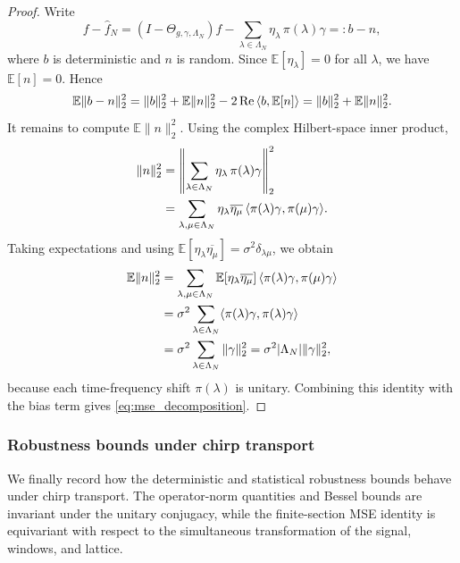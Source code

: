 \documentclass[final,1p,times,authoryear]{elsarticle}
\theoremstyle{definition}
\newcommand{\E}{\mathbb{E}}
\newcommand{\1}{\mathbf{1}}
\DeclareMathOperator{\Rea}{Re}
\DeclarePairedDelimiter{\inner}{\langle}{\rangle}
\begin{document}
{\begin{proof}
Write
$$
f-\widehat f_N
=
(I-\Theta_{g,\gamma,\Lambda_N})f
-
\sum_{\lambda\in\Lambda_N}\eta_\lambda\,\pi(\lambda)\gamma
=:b-n,
$$
where $b$ is deterministic and $n$ is random. Since $\E[\eta_\lambda]=0$ for all
$\lambda$, we have $\E[n]=0$. Hence
$$
\E\|b-n\|_2^2
=
\|b\|_2^2
+
\E\|n\|_2^2
-
2\Rea\,\inner{b,\E[n]}
=
\|b\|_2^2+\E\|n\|_2^2.
$$
It remains to compute $\E\|n\|_2^2$. Using the complex Hilbert-space inner product,
$$
\begin{aligned}
\|n\|_2^2
&=
\left\|
\sum_{\lambda\in\Lambda_N}\eta_\lambda\,\pi(\lambda)\gamma
\right\|_2^2 \\
&=
\sum_{\lambda,\mu\in\Lambda_N}
\eta_\lambda\overline{\eta_\mu}\,
\inner{\pi(\lambda)\gamma,\pi(\mu)\gamma}.
\end{aligned}
$$
Taking expectations and using
$\E[\eta_\lambda\overline{\eta_\mu}]=\sigma^2\delta_{\lambda\mu}$, we obtain
$$
\begin{aligned}
\E\|n\|_2^2
&=
\sum_{\lambda,\mu\in\Lambda_N}
\E[\eta_\lambda\overline{\eta_\mu}]\,
\inner{\pi(\lambda)\gamma,\pi(\mu)\gamma} \\
&=
\sigma^2
\sum_{\lambda\in\Lambda_N}
\inner{\pi(\lambda)\gamma,\pi(\lambda)\gamma} \\
&=
\sigma^2
\sum_{\lambda\in\Lambda_N}
\|\gamma\|_2^2
=
\sigma^2|\Lambda_N|\|\gamma\|_2^2,
\end{aligned}
$$
because each time-frequency shift $\pi(\lambda)$ is unitary. Combining this identity with the
bias term gives \eqref{eq:mse_decomposition}.
\end{proof}}

\subsubsection{Robustness bounds under chirp transport}
{We finally record how the deterministic and statistical robustness bounds behave under chirp
transport. The operator-norm quantities and Bessel bounds are invariant under the unitary
conjugacy, while the finite-section MSE identity is equivariant with respect to the simultaneous
transformation of the signal, windows, and lattice.}
\end{document}
